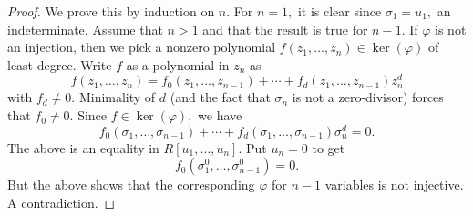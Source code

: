 \begin{proof}
    We prove this by induction on $n.$ For $n = 1,$ it is clear since $\sigma_1 = u_1,$ an indeterminate. Assume that $n > 1$ and that the result is true for $n - 1.$ If $\varphi$ is not an injection, then we pick a nonzero polynomial $f(z_1, \ldots, z_n) \in \ker(\varphi)$ of least degree. Write $f$ as a polynomial in $z_n$ as
    \begin{equation*} 
        f(z_1, \ldots, z_n) = f_0(z_1, \ldots, z_{n - 1}) + \cdots + f_d(z_1, \ldots, z_{n - 1})z_n^d
    \end{equation*}
    with $f_d \neq 0.$ Minimality of $d$ (and the fact that $\sigma_n$ is not a zero-divisor) forces that $f_0 \neq 0.$ Since $f \in \ker(\varphi),$ we have
    \begin{equation*} 
        f_0(\sigma_1, \ldots, \sigma_{n - 1}) + \cdots + f_d(\sigma_1, \ldots, \sigma_{n - 1})\sigma_n^d = 0.
    \end{equation*}
    The above is an equality in $R[u_1, \ldots, u_n].$ Put $u_n = 0$ to get
    \begin{equation*} 
        f_0(\sigma_1^0, \ldots, \sigma_{n - 1}^0) = 0.
    \end{equation*}
    But the above shows that the corresponding $\varphi$ for $n - 1$ variables is not injective. A contradiction.
\end{proof}

